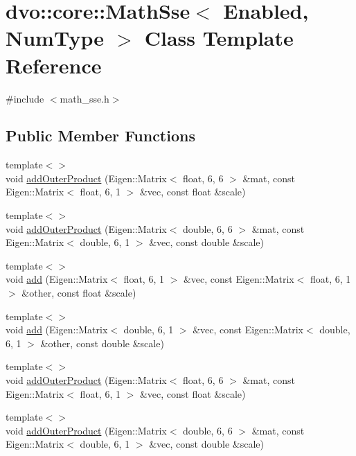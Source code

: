 \hypertarget{classdvo_1_1core_1_1_math_sse}{}\section{dvo\+:\+:core\+:\+:Math\+Sse$<$ Enabled, Num\+Type $>$ Class Template Reference}
\label{classdvo_1_1core_1_1_math_sse}


{\ttfamily \#include $<$math\+\_\+sse.\+h$>$}

\subsection*{Public Member Functions}
\begin{DoxyCompactItemize}
\item 
{\footnotesize template$<$$>$ }\\void \mbox{\hyperlink{classdvo_1_1core_1_1_math_sse_a5d8a137703df78832e1cfb591b290cb0}{add\+Outer\+Product}} (Eigen\+::\+Matrix$<$ float, 6, 6 $>$ \&mat, const Eigen\+::\+Matrix$<$ float, 6, 1 $>$ \&vec, const float \&scale)
\item 
{\footnotesize template$<$$>$ }\\void \mbox{\hyperlink{classdvo_1_1core_1_1_math_sse_a8403622e21ba348610e4ca96d7c1915c}{add\+Outer\+Product}} (Eigen\+::\+Matrix$<$ double, 6, 6 $>$ \&mat, const Eigen\+::\+Matrix$<$ double, 6, 1 $>$ \&vec, const double \&scale)
\item 
{\footnotesize template$<$$>$ }\\void \mbox{\hyperlink{classdvo_1_1core_1_1_math_sse_a942e37dc174d6ed03a48fcb9e9b53b88}{add}} (Eigen\+::\+Matrix$<$ float, 6, 1 $>$ \&vec, const Eigen\+::\+Matrix$<$ float, 6, 1 $>$ \&other, const float \&scale)
\item 
{\footnotesize template$<$$>$ }\\void \mbox{\hyperlink{classdvo_1_1core_1_1_math_sse_a569d441b55c932cf1220a93ef5f155f3}{add}} (Eigen\+::\+Matrix$<$ double, 6, 1 $>$ \&vec, const Eigen\+::\+Matrix$<$ double, 6, 1 $>$ \&other, const double \&scale)
\item 
{\footnotesize template$<$$>$ }\\void \mbox{\hyperlink{classdvo_1_1core_1_1_math_sse_a5d8a137703df78832e1cfb591b290cb0}{add\+Outer\+Product}} (Eigen\+::\+Matrix$<$ float, 6, 6 $>$ \&mat, const Eigen\+::\+Matrix$<$ float, 6, 1 $>$ \&vec, const float \&scale)
\item 
{\footnotesize template$<$$>$ }\\void \mbox{\hyperlink{classdvo_1_1core_1_1_math_sse_a8403622e21ba348610e4ca96d7c1915c}{add\+Outer\+Product}} (Eigen\+::\+Matrix$<$ double, 6, 6 $>$ \&mat, const Eigen\+::\+Matrix$<$ double, 6, 1 $>$ \&vec, const double \&scale)

\end{DoxyCompactItemize}
